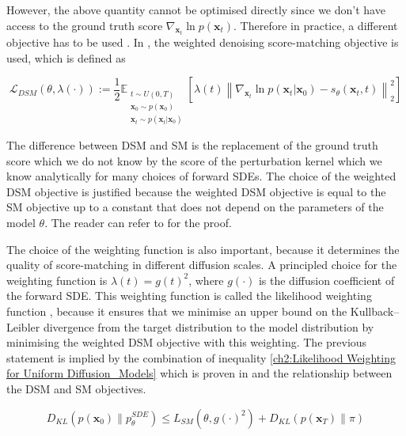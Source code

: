 However, the above quantity cannot be optimised directly since we don't have access to the ground truth score $\nabla_{\textbf{x}_t}{\ln{p(\textbf{x}_t)}}$. Therefore in practice, a different objective has to be used \cite{hyvarinen2005score_original, song2020generative_score, song2021sde}. In \cite{song2021sde}, the weighted denoising score-matching objective is used, which is defined as 

\begin{equation}
    \label{ch2:DSM for uniform diffusion_models}
    \mathcal{L}_{DSM}(\theta, \lambda(\cdot)) := \frac{1}{2} \mathbb{E}_{\substack{t \sim U(0,T) \\ \mathbf{x}_0 \sim p(\mathbf{x}_0) \\ \mathbf{x}_t \sim p(\mathbf{x}_t | \mathbf{x}_0)}}
    \left[\lambda(t) \left\| \nabla_{\mathbf{x}_t} \ln{p(\mathbf{x}_t | \mathbf{x}_0)} - s_\theta(\mathbf{x}_t,t) \right\|_2^2 \right]
\end{equation}
    

The difference between DSM and SM is the replacement of the ground truth score which we do not know by the score of the perturbation kernel which we know analytically for many choices of forward SDEs. The choice of the weighted DSM objective is justified because the weighted DSM objective is equal to the SM objective up to a constant that does not depend on the parameters of the model $\theta$. The reader can refer to \cite{vincent2011connection} for the proof. 

The choice of the weighting function is also important, because it determines the quality of score-matching in different diffusion scales. A principled choice for the weighting function is $\lambda(t) = g(t)^2$, where $g(\cdot)$ is the diffusion coefficient of the forward SDE. This weighting function is called the likelihood weighting function \cite{song2021maximum}, because it ensures that we minimise an upper bound on the Kullback–Leibler divergence from the target distribution to the model distribution by minimising the weighted DSM objective with this weighting. The previous statement is implied by the combination of inequality \ref{ch2:Likelihood Weighting for Uniform Diffusion_Models} which is proven in \cite{song2021maximum} and the relationship between the DSM and SM objectives.

\begin{equation}\label{ch2:Likelihood Weighting for Uniform Diffusion_Models}
D_{KL}(p(\textbf{x}_0)\parallel p^{SDE}_{\theta})\leq L_{SM}(\theta, g(\cdot)^2)+D_{KL}(p(\textbf{x}_T)\parallel \pi)
\end{equation}


